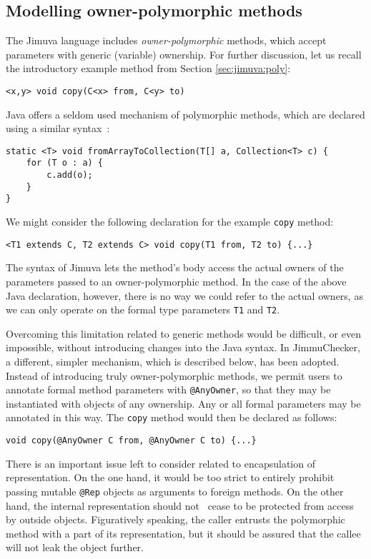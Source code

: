 \documentclass{pracamgr}
\theoremstyle{break}
\theoremstyle{break}
\theoremstyle{break}
\begin{document}
\subsection{Modelling owner-polymorphic methods}
\label{sec:mod:poly}

The Jimuva language includes \emph{owner-polymorphic} methods, which
accept parameters with generic (variable) ownership. For further
discussion, let us recall the introductory example method from Section
\ref{sec:jimuva:poly}:
\begin{center}
  \texttt{<x,y> void copy(C<x> from, C<y> to)}
\end{center}

Java offers a seldom used mechanism of polymorphic methods, which are
declared using a similar syntax~\cite{genericmethods}:
\begin{lstlisting}
static <T> void fromArrayToCollection(T[] a, Collection<T> c) {
    for (T o : a) {
        c.add(o);
    }
}
\end{lstlisting}

We might consider the following declaration for the example
\texttt{copy} method:
\begin{lstlisting}
<T1 extends C, T2 extends C> void copy(T1 from, T2 to) {...}
\end{lstlisting}
The syntax of Jimuva lets the method's body access the actual owners
of the parameters passed to an owner-polymorphic method. In the case
of the above Java declaration, however, there is no way we could refer
to the actual owners, as we can only operate on the formal type
parameters \texttt{T1} and \texttt{T2}.

Overcoming this limitation related to generic methods would be
difficult, or even impossible, without introducing changes into the
Java syntax. In JimmuChecker, a different, simpler mechanism, which is
described below, has been adopted. Instead of introducing truly
owner-polymorphic methods, we permit users to annotate formal method
parameters with \texttt{@AnyOwner}, so that they may be instantiated
with objects of any ownership. Any or all formal parameters may be
annotated in this way. The \texttt{copy} method would then be declared
as follows:
\begin{lstlisting}
void copy(@AnyOwner C from, @AnyOwner C to) {...}
\end{lstlisting}

There is an important issue left to consider related to encapsulation
of representation. On the one hand, it would be too strict to entirely
prohibit passing mutable \texttt{@Rep} objects as arguments to foreign
methods. On the other hand, the internal representation should not~
cease to be protected from access by outside objects. Figuratively
speaking, the caller entrusts the polymorphic method with a part of
its representation, but it should be assured that the callee will not
leak the object further.
\end{document}
